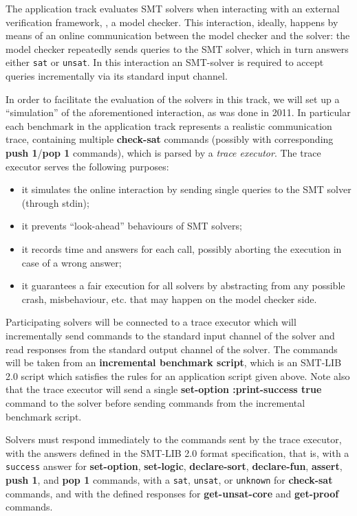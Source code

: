 \documentclass[12pt]{article}
\newcommand{\akey}[1]{\textbf{#1}}
\begin{document}
The application track evaluates SMT solvers when interacting
with an external verification framework, \eg, a model
checker. This interaction, ideally, happens by means of an online
communication between the model checker and the solver: the model
checker repeatedly sends queries to the SMT solver, which in turn
answers either \texttt{sat} or \texttt{unsat}.  In this interaction an SMT-solver is
required to accept queries incrementally via its standard input channel.

In order to facilitate the evaluation of the solvers in this track, we
will set up a ``simulation'' of the aforementioned interaction, as was done in 2011. In
particular each benchmark in the application track represents a realistic
communication trace, containing multiple \akey{check-sat} commands (possibly
with corresponding \akey{push 1}/\akey{pop 1} commands), which
is parsed by a {\em trace executor}. The trace executor serves the following purposes:
\begin{itemize}
\item it simulates the online interaction by sending single queries to the SMT solver
      (through stdin);
\item it prevents ``look-ahead'' behaviours of SMT solvers;
\item it records time and answers for each call, possibly aborting the execution
      in case of a wrong answer;
\item it guarantees a fair execution for all solvers by abstracting from any possible
      crash, misbehaviour, etc. that may happen on the model checker side.
\end{itemize}

Participating solvers will be connected to a trace executor 
which will incrementally send commands to the standard input channel of the solver
and read responses from the standard output channel of the solver.
The commands will be taken from an \textbf{incremental benchmark script},
which is an SMT-LIB 2.0 script which satisfies the rules for an application script given above.
Note also that the trace executor will send a single 
\akey{set-option :print-success true} command to the solver before 
sending commands from the incremental benchmark script.

\medskip
Solvers must respond immediately to the commands sent by the trace executor, 
with the answers defined in the SMT-LIB 2.0 format specification, that is,
with a \texttt{success} answer for 
\akey{set-option}, 
\akey{set-logic}, 
\akey{declare-sort}, 
\akey{declare-fun}, 
\akey{assert}, 
\akey{push 1}, 
and \akey{pop 1} 
commands,
 with a \texttt{sat}, \texttt{unsat}, or \texttt{unknown} 
for \akey{check-sat} commands, and with the defined responses for \akey{get-unsat-core} and \akey{get-proof} commands.
\end{document}
